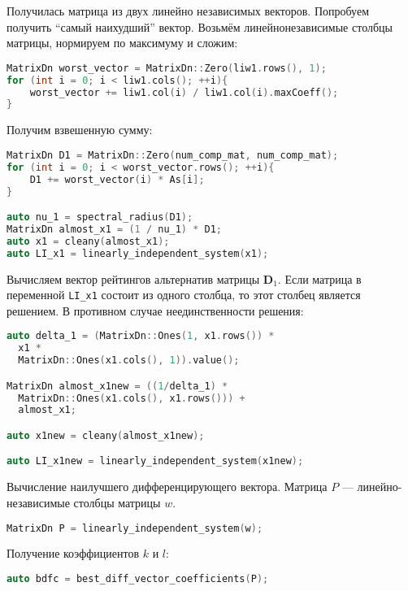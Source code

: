 \documentclass[specialist,
	substylefile = spbu_report.rtx,
	subf,href,colorlinks=true, 12pt]{disser}
\begin{document}
Получилась матрица из двух линейно независимых векторов. Попробуем получить \enquote{самый наихудший} вектор. Возьмём линейнонезависимые столбцы матрицы, нормируем по максимуму и сложим:
\begin{lstlisting}[language=c++,basicstyle=\footnotesize\ttfamily]
MatrixDn worst_vector = MatrixDn::Zero(liw1.rows(), 1);
for (int i = 0; i < liw1.cols(); ++i){
    worst_vector += liw1.col(i) / liw1.col(i).maxCoeff();
}
\end{lstlisting}


Получим взвешенную сумму:
\begin{lstlisting}[language=c++,basicstyle=\footnotesize\ttfamily]
MatrixDn D1 = MatrixDn::Zero(num_comp_mat, num_comp_mat);
for (int i = 0; i < worst_vector.rows(); ++i){
    D1 += worst_vector(i) * As[i];
}

auto nu_1 = spectral_radius(D1);
MatrixDn almost_x1 = (1 / nu_1) * D1;
auto x1 = cleany(almost_x1);
auto LI_x1 = linearly_independent_system(x1);
\end{lstlisting}

Вычисляем вектор рейтингов альтернатив матрицы $\mathbf{D}_{1}$.
Если матрица в переменной \texttt{LI\_x1} состоит из одного столбца, то этот столбец является решением. В противном случае неединственности решения:

\begin{lstlisting}[language=c++,basicstyle=\footnotesize\ttfamily]
auto delta_1 = (MatrixDn::Ones(1, x1.rows()) *
  x1 *
  MatrixDn::Ones(x1.cols(), 1)).value();

MatrixDn almost_x1new = ((1/delta_1) *
  MatrixDn::Ones(x1.cols(), x1.rows())) +
  almost_x1;

auto x1new = cleany(almost_x1new);

auto LI_x1new = linearly_independent_system(x1new);
\end{lstlisting}

Вычисление наилучшего дифференцирующего вектора.
Матрица $P$ --- линейно-независимые столбцы матрицы $w$.
\begin{lstlisting}[language=c++,basicstyle=\footnotesize\ttfamily]
MatrixDn P = linearly_independent_system(w);
\end{lstlisting}

Получение коэффициентов $k$ и $l$:
\begin{lstlisting}[language=c++,basicstyle=\footnotesize\ttfamily]
auto bdfc = best_diff_vector_coefficients(P);
\end{lstlisting}
\end{document}
